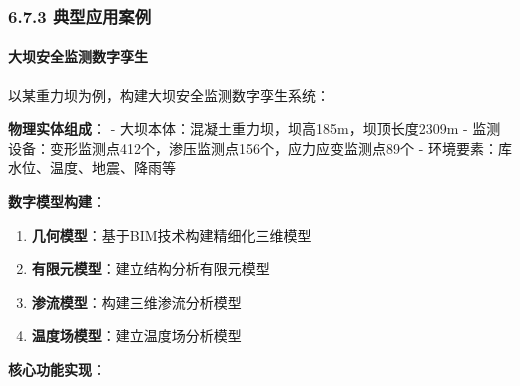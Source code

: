 \subsubsection{6.7.3 典型应用案例}\label{ux5178ux578bux5e94ux7528ux6848ux4f8b}

\paragraph{大坝安全监测数字孪生}\label{ux5927ux575dux5b89ux5168ux76d1ux6d4bux6570ux5b57ux5b6aux751f}

以某重力坝为例，构建大坝安全监测数字孪生系统：

\textbf{物理实体组成}： - 大坝本体：混凝土重力坝，坝高185m，坝顶长度2309m - 监测设备：变形监测点412个，渗压监测点156个，应力应变监测点89个 - 环境要素：库水位、温度、地震、降雨等

\textbf{数字模型构建}：

\begin{enumerate}
\def\labelenumi{\arabic{enumi}.}
\tightlist
\item
  \textbf{几何模型}：基于BIM技术构建精细化三维模型
\item
  \textbf{有限元模型}：建立结构分析有限元模型
\item
  \textbf{渗流模型}：构建三维渗流分析模型
\item
  \textbf{温度场模型}：建立温度场分析模型
\end{enumerate}

\textbf{核心功能实现}：

